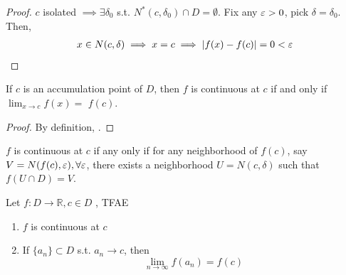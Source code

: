 \begin{proof}
    $c$ isolated $\implies \exists \delta_0$ s.t.
    $N^*(c, \delta_0) \cap D = \emptyset$. 
    Fix any $\varepsilon > 0$, pick $\delta = \delta_0$. 
    Then, 
    \begin{align*}
        x \in N(c, \delta) \implies x = c \implies
        |f(x) - f(c) | = 0 < \varepsilon
    \end{align*}
\end{proof}


\begin{proposition}
    If $c$ is an accumulation point of $D$, then 
    $f$ is continuous at $c$ if and only if $\lim_{x \to c}f(x)=$
    $f(c)$.
\end{proposition}

\begin{proof}
    By definition, .
\end{proof}




\begin{proposition}
    $f$ is continuous at $c$ if any only if for any neighborhood 
    of $f(c)$, say $V = N(f(c), \varepsilon), \forall \varepsilon$, 
    there exists a neighborhood $U = N(c, \delta)$ such that 
    $f(U \cap D) = V$.
\end{proposition}

\begin{theorem}
    Let $f: D \to \mathbb{R}, c \in D$ , TFAE
    \begin{enumerate}
        \item $f$ is continuous at $c$
        \item If $\{ a_n \} \subset D $ s.t. $a_n \to c$, then 
        \[
            \lim_{n \to \infty} f(a_n) = f(c)
        \]
    \end{enumerate} 
\end{theorem}

